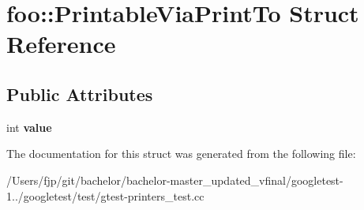 \hypertarget{structfoo_1_1_printable_via_print_to}{}\section{foo\+:\+:Printable\+Via\+Print\+To Struct Reference}
\label{structfoo_1_1_printable_via_print_to}
\subsection*{Public Attributes}
\begin{DoxyCompactItemize}
\item 
\mbox{\label{structfoo_1_1_printable_via_print_to_a16f8c6420275d86f0d0112ca5a41bca2}} 
int {\bfseries value}
\end{DoxyCompactItemize}


The documentation for this struct was generated from the following file\+:\begin{DoxyCompactItemize}
\item 
/\+Users/fjp/git/bachelor/bachelor-\/master\+\_\+updated\+\_\+vfinal/googletest-\/1../googletest/test/gtest-\/printers\+\_\+test.\+cc\end{DoxyCompactItemize}
